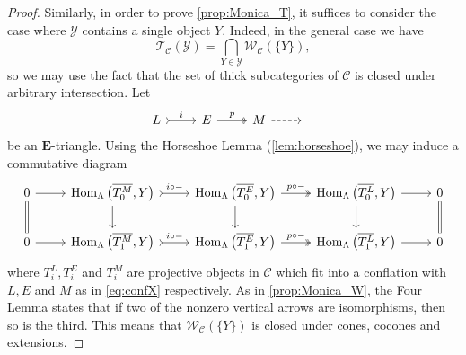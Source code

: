 \documentclass[10pt,twoside, a4paper,reqno]{amsart}
\DeclareMathOperator{\Hom}{Hom}
\newcommand{\calC}{\mathcal{C}}
\newcommand{\calT}{\mathcal{T}}
\newcommand{\calW}{\mathcal{W}}
\newcommand{\E}{\mathbf{E}}
\theoremstyle{definition}
\begin{document}
\begin{proof}
    Similarly, in order to prove \eqref{prop:Monica_T}, it suffices to consider the case where $\mathcal{Y}$ contains a single object $Y$. Indeed, in the general case we have
    \begin{equation*}
        \calT_{\calC}(\mathcal{Y}) = \bigcap_{Y\in\mathcal{Y}} \calW_{\calC}(\{Y\}),     
    \end{equation*}
    so we may use the fact that the set of thick subcategories of $\calC$ is closed under arbitrary intersection. Let 
    \begin{equation*}
        \begin{tikzcd}
            L \arrow[r,tail,"i"] & E \arrow[r,two heads,"p"] & M \arrow[r, dashed] & \phantom{x}
        \end{tikzcd}
    \end{equation*}
    be an $\E$-triangle. Using the Horseshoe Lemma (\cref{lem:horseshoe}), we may induce a commutative diagram
    \begin{equation}\label{eq:thickconfla}
        \begin{tikzcd}
    0 \arrow[r] \arrow[d, equal] & {\Hom_{\Lambda}\big(\overline{T_0^M}, Y \big)} \arrow[r, "i\circ -", tail] \arrow[d] & {\Hom_{\Lambda}\big(\overline{T_0^E}, Y\big)} \arrow[r, "p\circ -", two heads] \arrow[d] & {\Hom_{\Lambda}\big(\overline{T_0^L},Y\big)} \arrow[d] \arrow[r] & 0 \arrow[d, equal]  \\
    0 \arrow[r] & {\Hom_{\Lambda}\big(\overline{T_1^M},Y  \big)} \arrow[r, "i\circ -", tail]           & {\Hom_{\Lambda}\big(\overline{T_1^E},Y\big)} \arrow[r, "p\circ -", two heads]           & {\Hom_{\Lambda}\big(\overline{T_1^L},Y \big)}    \arrow[r] & 0           
\end{tikzcd}
    \end{equation}
    where $T_i^L, T_i^E$ and $T_i^M$ are projective objects in $\calC$ which fit into a conflation with $L, E$ and $M$ as in \eqref{eq:confX} respectively. As in \eqref{prop:Monica_W}, the Four Lemma states that if two of the nonzero vertical arrows are isomorphisms, then so is the third. This means that $\calW_{\calC}(\{Y\})$ is closed under cones, cocones and extensions.
    

\end{proof}
\end{document}

